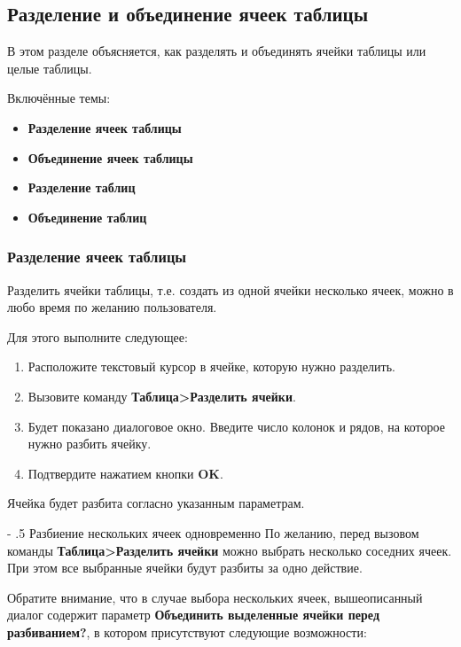\documentclass[a4paper,10pt]{article}
\makeatletter
\renewcommand\paragraph{%
   \@startsection{paragraph}{4}{0mm}%
      {-\baselineskip}%
      {.5\baselineskip}%
      {\normalfont\normalsize\bfseries}}
\makeatother
\begin{document}
\subsection{Разделение и объединение ячеек таблицы}
В этом разделе объясняется, как разделять и объединять ячейки таблицы или целые таблицы.

Включённые темы:

\begin{itemize}
 \item \textbf{Разделение ячеек таблицы}
 \item \textbf{Объединение ячеек таблицы}
 \item \textbf{Разделение таблиц}
 \item \textbf{Объединение таблиц}
\end{itemize}

\subsubsection{Разделение ячеек таблицы}
Разделить ячейки таблицы, т.е. создать из одной ячейки несколько ячеек, можно в любо время по желанию пользователя. 

Для этого выполните следующее:

\begin{enumerate}
 \item Расположите текстовый курсор в ячейке, которую нужно разделить.
 \item Вызовите команду \textbf{Таблица>Разделить ячейки}.
 \item Будет показано диалоговое окно. Введите число колонок и рядов, на которое нужно разбить ячейку.
 \item Подтвердите нажатием кнопки \textbf{OK}.
\end{enumerate}

Ячейка будет разбита согласно указанным параметрам.

\paragraph{Разбиение нескольких ячеек одновременно}
По желанию, перед вызовом команды \textbf{Таблица>Разделить ячейки} можно выбрать несколько соседних ячеек. При этом все выбранные ячейки будут разбиты за одно  действие. 

Обратите внимание, что в случае выбора нескольких ячеек, вышеописанный диалог содержит параметр \textbf{Объединить выделенные ячейки перед разбиванием?}, в котором присутствуют следующие возможности: 
\end{document}
